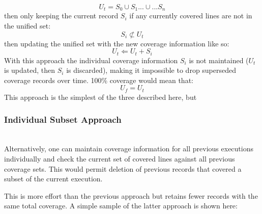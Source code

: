 \begin{equation*}
  U_t = S_0 \cup S_1 ...\cup... S_n
\end{equation*}
then only keeping the current record $S_i$ if any currently 
covered lines are not in the unified set:
\begin{equation*}
  S_i \not \subset U_t
\end{equation*}
then updating the unified set with the new coverage information like so:
\begin{equation*}
  U_t \Leftarrow U_t + S_i
\end{equation*} 
With this approach the individual coverage information $S_i$ is not maintained 
($U_t$ is updated, then $S_i$ is discarded), making it impossible to drop superseded 
coverage records over time.  100\% coverage would mean that:
\begin{equation*}
  U_f = U_t
\end{equation*} 
This approach is the simplest of the three described here, but 
\subsubsection{Individual Subset Approach}\label{sec:tuning-2}
\hfill\\
Alternatively, one can maintain coverage information for all previous
 executions individually and check the current set of covered lines
  against all previous coverage sets.  This would permit deletion of 
  previous records that covered a subset of the current execution.  

This is more effort than the previous approach but retains fewer records 
with the same total coverage.  A simple sample of the latter approach is shown here:

